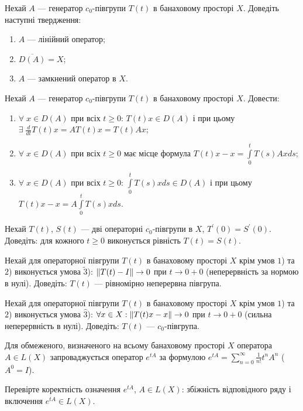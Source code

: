 \begin{exercise}
    Нехай $A$ --- генератор $c_0$-півгрупи $T(t)$ в банаховому просторі $X$. Доведіть наступні твердження:
    \begin{enumerate}
        \item $A$ --- лінійний оператор;
        \item $\overline{D(A)} = X$;
        \item $A$ --- замкнений оператор в $X$.
    \end{enumerate}
\end{exercise}

\begin{exercise}
    Нехай $A$ --- генератор $c_0$-півгрупи $T(t)$ в банаховому просторі $X$. Довести:
    \begin{enumerate}
        \item $\forall \; x \in D(A)$ при всіх $t \geq 0$: $T(t)x \in D(A)$ і при цьому $\exists \; \frac{d}{dt} T(t)x = A T(t)x = T(t) Ax$;
        \item $\forall \; x \in D(A)$ при всіх $t \geq 0$ має місце формула $T(t)x - x = \int\limits_0^t T(s) Ax ds$;
        \item $\forall \; x \in D(A)$ при всіх $t \geq 0$: $\int\limits_0^t T(s)x ds \in D(A)$ і при цьому $T(t)x - x = A \int\limits_0^t T(s)x ds$.
    \end{enumerate}
\end{exercise}

\begin{exercise}
    Нехай $T(t)$, $S(t)$ --- дві операторні $c_0$-півгрупи в $X$, $T^\prime(0) = S^\prime(0)$. Доведіть:
    для кожного $t \geq 0$ виконується рівність $T(t) = S(t)$. 
\end{exercise}

\begin{exercise}
    Нехай для операторної півгрупи $T(t)$ в банаховому просторі $X$ крім умов
    $1$) та $2$) виконується умова $\tilde{3}$): $\left\lVert T(t) - I\right\rVert \to 0$ при $t\to 0 + 0$ (неперервність за нормою в нулі).
    Доведіть: $T(t)$ --- рівномірно неперервна півгрупа.
\end{exercise}

\begin{exercise}
    Нехай для операторної півгрупи $T(t)$ в банаховому просторі $X$ крім умов
    $1$) та $2$) виконується умова $\hat{3}$): $\forall x \in X : \left\lVert T(t)x - x\right\rVert \to 0$ при $t\to 0 + 0$ (сильна неперервність в нулі).
    Доведіть: $T(t)$ --- $c_0$-півгрупа.
\end{exercise}

\begin{theory}
    Для обмеженого, визначеного на всьому банаховому просторі $X$ оператора
    $A \in L(X)$ запроваджується оператор $e^{tA}$ за формулою
    $e^{tA} = \sum\limits_{n=0}^{\infty} \frac{1}{n!} t^n A^n$ ($A^0 = I$).
\end{theory}

\begin{exercise}
    Перевірте коректність означення $e^{tA}$, $A \in L(X)$:
    збіжність відповідного ряду і включення $e^{tA} \in L(X)$.
\end{exercise}